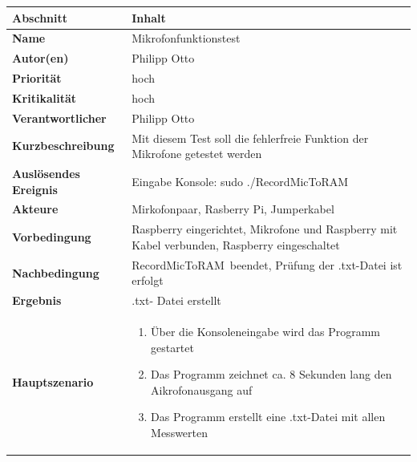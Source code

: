 %

\newpage

\begin{tabularx}{\columnwidth}{|p{4cm}|X|}
	\hline
	\textbf{Abschnitt} & \textbf{Inhalt}\\
	\hline
	\textbf{Name} & Mikrofonfunktionstest\\
	\hline
	\textbf{Autor(en)} & Philipp Otto\\
	\hline
	\textbf{Priorität} & hoch\\	
	\hline	
	\textbf{Kritikalität} & hoch\\
	\hline
	\textbf{Verantwortlicher} & Philipp Otto\\
	\hline
	\textbf{Kurzbeschreibung} & Mit diesem Test soll die fehlerfreie Funktion der Mikrofone getestet werden\\
	\hline
	\textbf{Auslösendes Ereignis} & Eingabe Konsole: \glqq sudo ./RecordMicToRAM\grqq
	\\
	\hline
	\textbf{Akteure} & Mirkofonpaar, Rasberry Pi, Jumperkabel\\
	\hline
	\textbf{Vorbedingung} & Raspberry eingerichtet, Mikrofone und Raspberry mit Kabel verbunden, Raspberry eingeschaltet\\
	\hline
	\textbf{Nachbedingung} & \glqq RecordMicToRAM\grqq\ beendet,
	Prüfung der .txt-Datei ist erfolgt
	\\
	\hline
	\textbf{Ergebnis} & .txt- Datei erstellt\\
	\hline
	\textbf{Hauptszenario} & \begin{enumerate}
								\item Über die Konsoleneingabe wird das Programm gestartet
								\item Das Programm zeichnet ca. 8 Sekunden lang den Aikrofonausgang auf
								\item Das Programm erstellt eine .txt-Datei mit allen Messwerten

\end{enumerate}
\end{tabularx}
